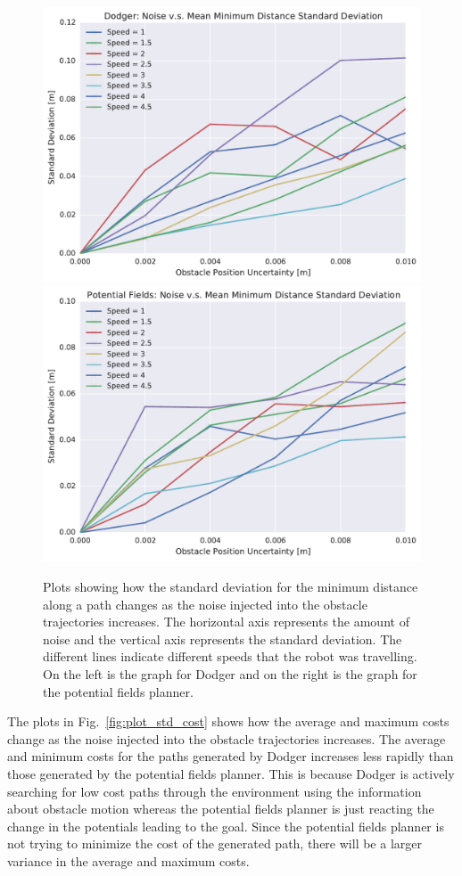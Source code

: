 \documentclass[letterpaper, 10pt, conference]{ieeeconf}
\begin{document}
\begin{figure}[h!]
    \centering
    \includegraphics[width=0.48\linewidth]{figs/planner_std_min_distance_0}
    \includegraphics[width=0.48\linewidth]{figs/pf_std_min_distance_0}

    \caption{Plots showing how the standard deviation for the minimum distance
        along a path changes as the noise injected into the obstacle
        trajectories increases. The horizontal axis represents the amount of
        noise and the vertical axis represents the standard deviation. The
        different lines indicate different speeds that the robot was
    travelling. On the left is the graph for Dodger and on the right is the
graph for the potential fields planner.}

    \label{fig:plot_std_min_distance}
\end{figure}

The plots in Fig.~\ref{fig:plot_std_cost} shows how the average and maximum
costs change as the noise injected into the obstacle trajectories increases.
The average and minimum costs for the paths generated by Dodger increases less
rapidly than those generated by the potential fields planner. This is because
Dodger is actively searching for low cost paths through the environment using
the information about obstacle motion whereas the potential fields planner is
just reacting the change in the potentials leading to the goal. Since the
potential fields planner is not trying to minimize the cost of the generated
path, there will be a larger variance in the average and maximum costs.
\end{document}
